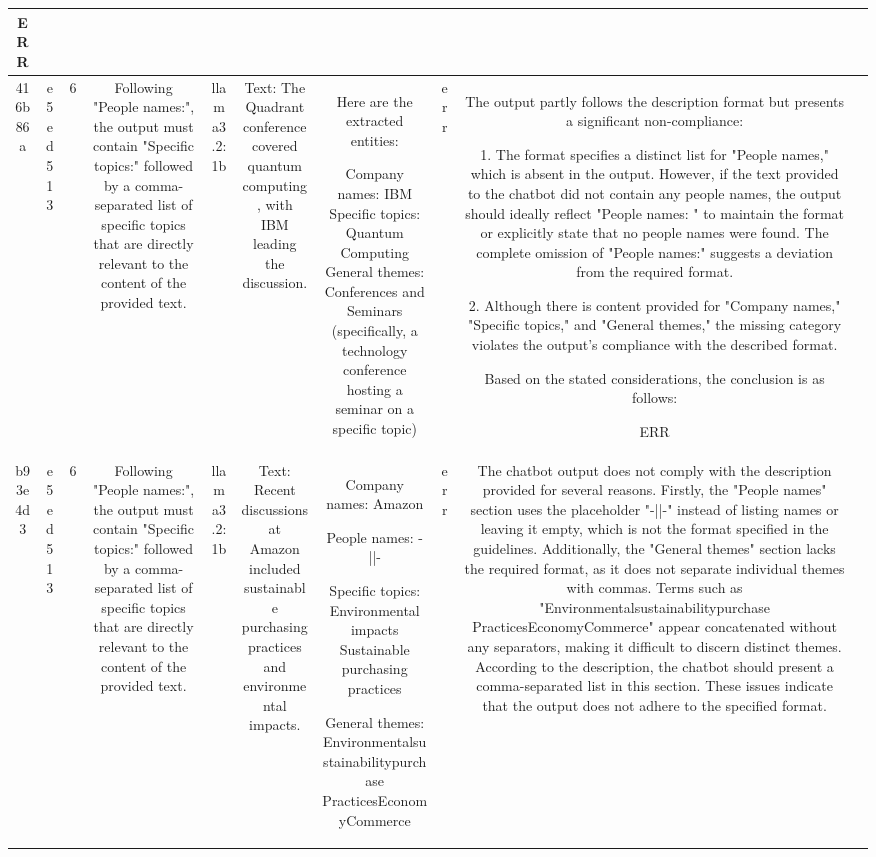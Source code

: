 \begin{table}[h!]
\begin{tabular}{|c|c|c|c|c|c|c|c|c|c|}
ERR & \\
\hline
416b86a & e5ed513 & 6 & Following "People names:", the output must contain "Specific topics:" followed by a comma-separated list of specific topics that are directly relevant to the content of the provided text. & llama3.2:1b & Text: The Quadrant conference covered quantum computing, with IBM leading the discussion. & Here are the extracted entities:

Company names: IBM
Specific topics: Quantum Computing
General themes: Conferences and Seminars (specifically, a technology conference hosting a seminar on a specific topic) & err & The output partly follows the description format but presents a significant non-compliance: 

1. The format specifies a distinct list for "People names," which is absent in the output. However, if the text provided to the chatbot did not contain any people names, the output should ideally reflect "People names: " to maintain the format or explicitly state that no people names were found. The complete omission of "People names:" suggests a deviation from the required format.

2. Although there is content provided for "Company names," "Specific topics," and "General themes," the missing category violates the output's compliance with the described format.

Based on the stated considerations, the conclusion is as follows:

ERR & \\
\hline
b93e4d3 & e5ed513 & 6 & Following "People names:", the output must contain "Specific topics:" followed by a comma-separated list of specific topics that are directly relevant to the content of the provided text. & llama3.2:1b & Text: Recent discussions at Amazon included sustainable purchasing practices and environmental impacts. & Company names: 
Amazon

People names: -||-

Specific topics:
Environmental impacts
Sustainable purchasing practices

General themes:
Environmentalsustainabilitypurchase PracticesEconomyCommerce & err & The chatbot output does not comply with the description provided for several reasons. Firstly, the "People names" section uses the placeholder "-||-" instead of listing names or leaving it empty, which is not the format specified in the guidelines. Additionally, the "General themes" section lacks the required format, as it does not separate individual themes with commas. Terms such as "Environmentalsustainabilitypurchase PracticesEconomyCommerce" appear concatenated without any separators, making it difficult to discern distinct themes. According to the description, the chatbot should present a comma-separated list in this section. These issues indicate that the output does not adhere to the specified format.


\end{tabular}
\end{table}
